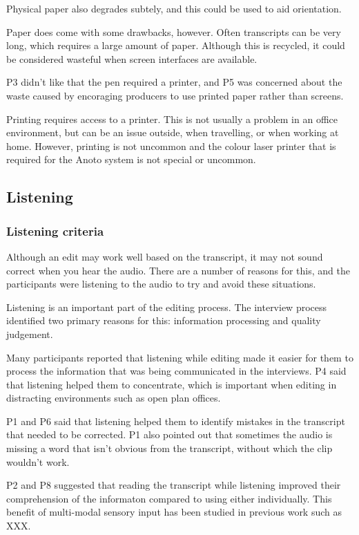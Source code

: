Physical paper also degrades subtely, and this could be used to aid orientation.


Paper does come with some drawbacks, however. Often transcripts can be very long, which requires a large amount of
paper. Although this is recycled, it could be considered wasteful when screen interfaces are available.

P3 didn't like that the pen required a printer, and P5 was concerned about the waste caused by encoraging producers to
use printed paper rather than screens.

Printing requires access to a printer. This is not usually a problem in an office environment, but can be an issue
outside, when travelling, or when working at home. However, printing is not uncommon and the colour laser printer that
is required for the Anoto system is not special or uncommon.

\subsection{Listening}

\subsubsection{Listening criteria}

Although an edit may work well based on the transcript, it may not sound correct when you hear the audio. There are a
number of reasons for this, and the participants were listening to the audio to try and avoid these situations.

Listening is an important part of the editing process. The interview process identified two primary reasons for this:
information processing and quality judgement.


Many participants reported that listening while editing made it easier for them to process the information that was
being communicated in the interviews. P4 said that listening helped them to concentrate, which is important when
editing in distracting environments such as open plan offices.

P1 and P6 said that listening helped them to identify mistakes in the transcript that needed to be corrected. P1 also
pointed out that sometimes the audio is missing a word that isn't obvious from the transcript, without which the clip
wouldn't work.

P2 and P8 suggested that reading the transcript while listening improved their comprehension of the informaton compared
to using either individually. This benefit of multi-modal sensory input has been studied in previous work such as XXX.

